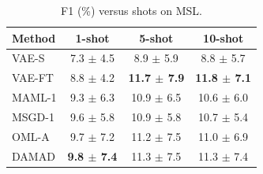 \begin{table}[t]
\centering
\small
\caption{F1 (\%) versus shots on MSL.}
\label{tab:shots_msl}
\begin{tabular}{lccc}
\toprule
Method & 1-shot & 5-shot & 10-shot \\
\midrule
VAE-S & 7.3 $\pm$ 4.5 & 8.9 $\pm$ 5.9 & 8.8 $\pm$ 5.7 \\
VAE-FT & 8.8 $\pm$ 4.2 & \textbf{11.7 $\pm$ 7.9} & \textbf{11.8 $\pm$ 7.1} \\
MAML-1 & 9.3 $\pm$ 6.3 & 10.9 $\pm$ 6.5 & 10.6 $\pm$ 6.0 \\
MSGD-1 & 9.6 $\pm$ 5.8 & 10.9 $\pm$ 5.8 & 10.7 $\pm$ 5.4 \\
OML-A & 9.7 $\pm$ 7.2 & 11.2 $\pm$ 7.5 & 11.0 $\pm$ 6.9 \\
DAMAD & \textbf{9.8 $\pm$ 7.4} & 11.3 $\pm$ 7.5 & 11.3 $\pm$ 7.4 \\
\bottomrule
\end{tabular}
\end{table}

